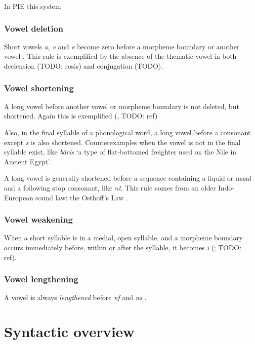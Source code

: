 \documentclass[a4paper, oneside, 12pt]{report}
\newcommand*{\citesec}[1]{\S~{#1}}
\newcommand*{\citepage}[1]{p.~{#1}}
\newcommand{\form}[1]{\emph{#1}}
\newcommand{\translate}[1]{`#1'}
\begin{document}
In PIE this system 

\subsection{Vowel deletion}\label{sec:phonology.rule.deletion}

Short vowels \form{a}, \form{o} and \form{e} 
become zero before a morpheme boundary or another vowel
\citep[\citesec{8.3}]{oniga2014latin}.
This rule is exemplified by the absence 
of the thematic vowel in both declension (TODO: rosis)
and conjugation (TODO).

\subsection{Vowel shortening}\label{sec:phonology.rule.shortening}

A long vowel before another vowel or morpheme boundary 
is not deleted, but shortened.
Again this is exemplified (, TODO: ref)

Also, in the final syllable of a phonological word,
a long vowel before a consonant except \form{s} is also shortened.
Counterexamples when the vowel is not in the final syllable exist,
like \form{b\={a}ris} \translate{a type of flat-bottomed freighter used on the Nile in Ancient Egypt}.

A long vowel is generally shortened before a sequence 
containing a liquid or nasal and a following stop consonant,
like \form{nt}.
This rule comes from an older Indo-European sound law: 
the Osthoff's Law
\citep[\citepage{55}]{oniga2014latin}.

\subsection{Vowel weakening}

When a short syllable is in a medial, open syllable,
and a morpheme boundary occurs immediately before, within or after the syllable,
it becomes \form{i} 
(\citealt[\citepage{55}]{oniga2014latin}; TODO: ref).

\subsection{Vowel lengthening}

A vowel is always \emph{lengthened} before \form{nf} and \form{ns}
\citep[\citepage{55}]{oniga2014latin}.

\chapter{Syntactic overview}
\end{document}
